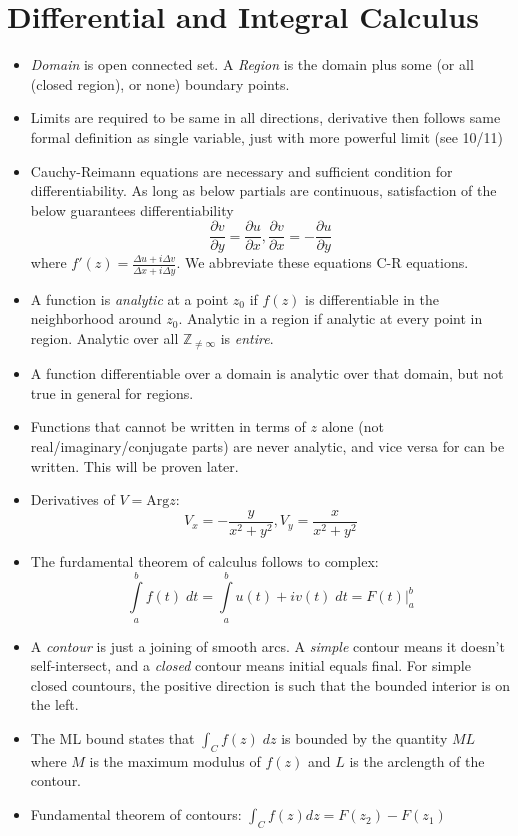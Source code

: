 \documentclass[10pt]{report}
\newcommand{\pd}[2]{\frac{\partial #1}{\partial#2}}
\newcommand{\Arg}[0]{\mathrm{Arg} }
\begin{document}
\section{Differential and Integral Calculus}
\begin{itemize}
	\item \emph{Domain} is open connected set. A \emph{Region} is the domain plus some (or all (closed region), or none) boundary points. 
	\item Limits are required to be same in all directions, derivative then follows same formal definition as single variable, just with more powerful limit (see 10/11)
	\item Cauchy-Reimann equations are necessary and sufficient condition for differentiability. As long as below partials are continuous, satisfaction of the below guarantees differentiability
		$$\pd{v}{y} = \pd{u}{x} , \pd{v}{x}=-\pd{u}{y}$$
		where $f'(z) = \frac{\Delta u + i\Delta v}{\Delta x + i\Delta y}$. We abbreviate these equations C-R equations. 
	\item A function is \emph{analytic} at a point $z_0$ if $f(z)$ is differentiable in the neighborhood around $z_0$. Analytic in a region if analytic at every point in region. Analytic over all $\mathbb{Z}_{\neq \infty}$ is \emph{entire}.
	\item A function differentiable over a domain is analytic over that domain, but not true in general for regions.
	\item Functions that cannot be written in terms of $z$ alone (not real/imaginary/conjugate parts) are never analytic, and vice versa for can be written. This will be proven later.
	\item Derivatives of $V = \Arg z$:
		$$V_x = -\frac{y}{x^2 + y^2}, V_y = \frac{x}{x^2 + y^2}$$
	\item The furdamental theorem of calculus follows to complex:
		$$\displaystyle\int\limits_{a}^{b}f(t)\;dt = \displaystyle\int\limits_{a}^{b}u(t) + iv(t)\;dt = \left.F(t)\right|_a^b$$
	\item A \emph{contour} is just a joining of smooth arcs. A \emph{simple} contour means it doesn't self-intersect, and a \emph{closed} contour means initial equals final. For simple closed countours, the positive direction is such that the bounded interior is on the left.
	\item The ML bound states that $\int_C f(z)\; dz$ is bounded by the quantity $ML$ where $M$ is the maximum modulus of $f(z)$ and $L$ is the arclength of the contour.
	\item Fundamental theorem of contours: $\int_C f(z) dz = F(z_2) - F(z_1)$

\end{itemize}
\end{document}
